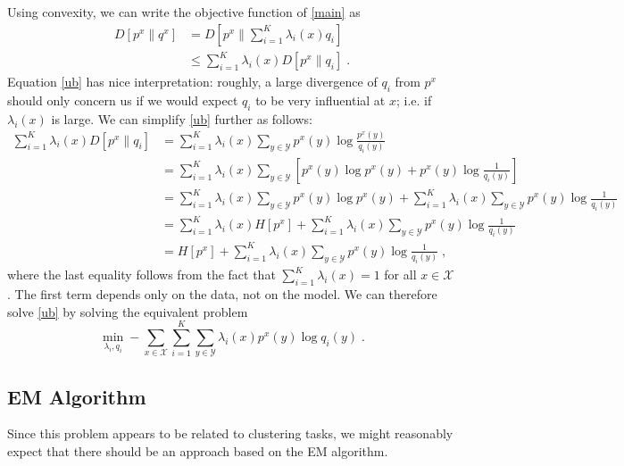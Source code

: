 \documentclass[english]{scrartcl}
\begin{document}
		Using convexity, we can write the objective function of \eqref{main} as 
		\begin{align}
			D[p^x\|q^x] &= D\left[p^x\bigg\|\sum_{i=1}^K\lambda_i(x)q_i\right] \\
			&\leq \sum_{i=1}^K\lambda_i(x)D\left[p^x\|q_i\right]\;. \label{ub}
		\end{align} 
		Equation \eqref{ub} has nice interpretation: roughly, a large divergence of $q_i$ from $p^x$ should only concern us if we would expect $q_i$ to be very influential at $x$; i.e. if $\lambda_i(x)$ is large. 
		We can simplify \eqref{ub} further as follows: 
		\begin{align*}
			\sum_{i=1}^K\lambda_i(x)D\left[p^x\|q_i\right] &= \sum_{i=1}^K\lambda_i(x)\sum_{y \in \mathcal{Y}} p^x(y) \log\frac{p^x(y)}{q_i(y)} \\
			&= \sum_{i=1}^K\lambda_i(x)\sum_{y \in \mathcal{Y}} \left[ p^x(y) \log p^x(y) + p^x(y) \log \frac{1}{q_i(y)}\right] \\
			&= \sum_{i=1}^K\lambda_i(x)\sum_{y \in \mathcal{Y}}  p^x(y) \log p^x(y) + \sum_{i=1}^K\lambda_i(x)\sum_{y \in \mathcal{Y}} p^x(y) \log \frac{1}{q_i(y)} \\
			&= \sum_{i=1}^K\lambda_i(x)H[p^x] + \sum_{i=1}^K\lambda_i(x)\sum_{y \in \mathcal{Y}} p^x(y) \log \frac{1}{q_i(y)} \\
			&= H[p^x] + \sum_{i=1}^K\lambda_i(x)\sum_{y \in \mathcal{Y}} p^x(y) \log \frac{1}{q_i(y)}\;,
		\end{align*}
		where the last equality follows from the fact that $\sum_{i=1}^K \lambda_i(x) = 1$ for all $x\in \mathcal{X}$. The first term depends only on the data, not on the model. We can therefore solve \eqref{ub} by solving the equivalent problem 
		\begin{equation}
			\min_{\lambda_i, q_i} - \sum_{x \in \mathcal{X}}\sum_{i=1}^K\sum_{y \in \mathcal{Y}}\lambda_i(x) p^x(y) \log q_i(y)\;.
		\end{equation}

	\subsection{EM Algorithm}
		Since this problem appears to be related to clustering tasks, we might reasonably expect that there should be an approach based on the EM algorithm. 
\end{document}
